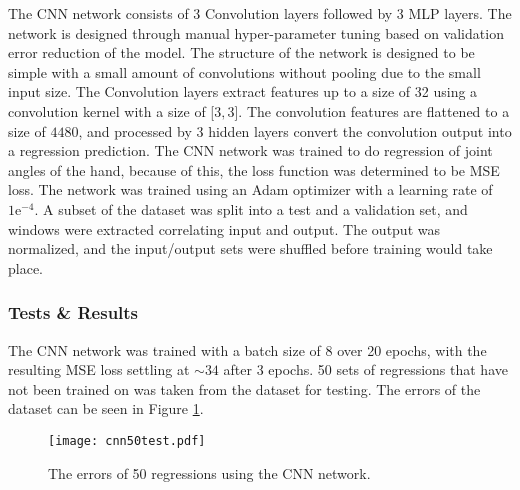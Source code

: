 \documentclass[../main.tex]{subfiles}
\begin{document}
The CNN network consists of 3 Convolution layers followed by 3 MLP layers.
The network is designed through manual hyper-parameter tuning based on validation error reduction of the model.
The structure of the network is designed to be simple with a small amount of convolutions without pooling due to the small input size.
The Convolution layers extract features up to a size of 32 using a convolution kernel with a size of [$3, 3$].
The convolution features are flattened to a size of $4480$, and processed by 3 hidden layers convert the convolution output into a regression prediction.
The CNN network was trained to do regression of joint angles of the hand, because of this, the loss function was determined to be MSE loss.
The network was trained using an Adam optimizer with a learning rate of $1\text{e}^{-4}$.
A subset of the dataset was split into a test and a validation set, and windows were extracted correlating input and output.
The output was normalized, and the input/output sets were shuffled before training would take place.


\subsubsection{Tests \& Results}


%
The CNN network was trained with a batch size of 8 over 20 epochs, with the resulting MSE loss settling at $\sim 34$ after 3 epochs.
50 sets of regressions that have not been trained on was taken from the dataset for testing.
The errors of the dataset can be seen in Figure \ref{fig:cnntest}.

\begin{figure}[H]
\begin{center}
\texttt{[image: cnn50test.pdf]}
\caption{The errors of 50 regressions using the CNN network.}
\label{fig:cnntest}
\end{center}
\end{figure}
\end{document}
